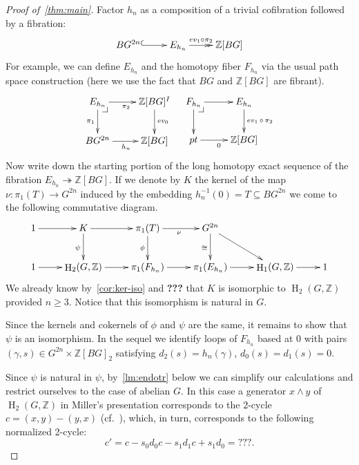 \documentclass[oneside, 12pt]{amsart}
\makeatletter
\theoremstyle{plain}
\numberwithin{equation}{section}
\numberwithin{lemma}{section}
\theoremstyle{remark}
\theoremstyle{definition}
\DeclareMathOperator{\HH}{H}
\newcommand{\ZZ}{\mathbb{Z}}
\newcommand{\pullbackcorner}[1][dr]{\save*!/#1-1.2pc/#1:(-1,1)@^{|-}\restore}
\makeatother
\begin{document}
\begin{proof}[Proof of~\cref{thm:main}]
Factor $h_n$ as a composition of a trivial cofibration followed by a fibration: 
\begin{equation} \label{eq:fibr-repl} \xymatrix{BG^{2n} \ar@{^{(}->}[r] & E_{h_n} \ar@{->>}^(.45){ev_1 \circ \pi_2}[r] & \ZZ[BG]} \end{equation}
For example, we can define $E_{h_n}$ and the homotopy fiber $F_{h_n}$ via the usual path space construction
 (here we use the fact that $BG$ and $\ZZ[BG]$ are fibrant).
\[ \xymatrix{ E_{h_n}  \ar[r]_{\pi_2} \ar[d]_{\pi_1} \pullbackcorner & \ar[d]^{ev_0} \ZZ[BG]^I\\
              BG^{2n} \ar[r]_{h_n} & \ZZ[BG] } \ \ \ 
   \xymatrix{ F_{h_n}  \ar[r] \ar[d] \pullbackcorner & \ar[d]^{ev_1\,\circ\,\pi_2} E_{h_n} \\
              pt \ar[r]_{0} & \ZZ[BG]}  \]
Now write down the starting portion of the long homotopy exact sequence of the fibration $E_{h_n} \twoheadrightarrow \ZZ[BG]$.
If we denote by $K$ the kernel of the map $\nu\colon \pi_1(T) \to G^{2n}$ induced by the embedding $h_n^{-1}(0)=T \subseteq BG^{2n}$ we 
 come to the following commutative diagram.
\[ \xymatrix{1 \ar[r] & K       \ar[d]_{\psi} \ar[r] & \pi_1(T) \ar[d]_{\phi} \ar[r]_{\nu}     & G^{2n} \ar[rd] \ar[d]_{\cong} &                      & \\
             1 \ar[r] & \HH_2(G, \ZZ) \ar[r] & \pi_1(F_{h_n})           \ar[r]  & \pi_1(E_{h_n}) \ar[r]  & \HH_1(G, \ZZ) \ar[r] & 1}\]
We already know by~\cref{cor:ker-iso} and {\bf ???} that $K$ is isomorphic to $\HH_2(G, \ZZ)$ provided $n\geq 3$.
Notice that this isomorphism is natural in $G$.

Since the kernels and cokernels of $\phi$ and $\psi$ are the same, it remains to show that $\psi$ is an isomorphism.
In the sequel we identify loops of $F_{h_n}$ based at $0$ with pairs $(\gamma, s) \in G^{2n} \times \ZZ[BG]_2$ satisfying $d_2(s) = h_n(\gamma)$, $d_0(s) = d_1(s)=0$.

Since $\psi$ is natural in $\psi$, by~\cref{lm:endotr} below we can simplify our calculations and restrict ourselves to the case of abelian $G$.
In this case a generator $x \wedge y$ of $\HH_2(G, \ZZ)$ in Miller's presentation corresponds to the 2-cycle $c = (x, y) - (y, x)$ (cf.~\cite[(14), p.~582]{Mi52}), which,
  in turn, corresponds to the following normalized 2-cycle:
 \[c' = c - s_0d_0c - s_1d_1c + s_1d_0 = ???. \]
 

\end{proof}
\end{document}

